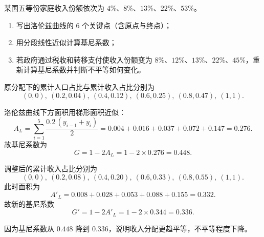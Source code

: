 \begin{question}
某国五等份家庭收入份额依次为 $4\%$、$8\%$、$13\%$、$22\%$、$53\%$。

\begin{enumerate}[label=(\arabic*),leftmargin=2.5em]
  \item 写出洛伦兹曲线的 6 个关键点（含原点与终点）；
  \item 用分段线性近似计算基尼系数；
  \item 若政府通过税收和转移支付使收入份额变为 $8\%$、$12\%$、$13\%$、$22\%$、$45\%$，重新计算基尼系数并判断不平等如何变化。
\end{enumerate}

\begin{solution}
原分配下的累计人口占比与累计收入占比分别为
\[
(0,0),\ (0.2,0.04),\ (0.4,0.12),\ (0.6,0.25),\ (0.8,0.47),\ (1,1).
\]

洛伦兹曲线下方面积用梯形面积近似：
\[
A_L=\sum_{i=1}^{5}\frac{0.2\,(y_{i-1}+y_i)}{2}
=0.004+0.016+0.037+0.072+0.147=0.276.
\]
故基尼系数为
\[
G=1-2A_L=1-2\times 0.276=0.448.
\]

调整后的累计收入占比分别为
\[
(0,0),\ (0.2,0.08),\ (0.4,0.20),\ (0.6,0.33),\ (0.8,0.55),\ (1,1).
\]
此时面积为
\[
A'_L=0.008+0.028+0.053+0.088+0.155=0.332.
\]
故新的基尼系数
\[
G'=1-2A'_L=1-2\times 0.344=0.336.
\]

因为基尼系数从 $0.448$ 降到 $0.336$，说明收入分配更趋平等，不平等程度下降。
\end{solution}
\end{question}

